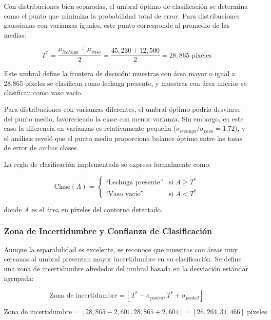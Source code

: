 Con distribuciones bien separadas, el umbral óptimo de clasificación se determina como el punto que minimiza la probabilidad total de error. Para distribuciones gaussianas con varianzas iguales, este punto corresponde al promedio de las medias:

\begin{equation}
T^* = \frac{\mu_{lechuga} + \mu_{vaso}}{2} = \frac{45,230 + 12,500}{2} = 28,865 \text{ píxeles}
\end{equation}

Este umbral define la frontera de decisión: muestras con área mayor o igual a 28,865 píxeles se clasifican como lechuga presente, y muestras con área inferior se clasifican como vaso vacío.

Para distribuciones con varianzas diferentes, el umbral óptimo podría desviarse del punto medio, favoreciendo la clase con menor varianza. Sin embargo, en este caso la diferencia en varianzas es relativamente pequeña ($\sigma_{lechuga}/\sigma_{vaso} = 1.72$), y el análisis reveló que el punto medio proporciona balance óptimo entre las tasas de error de ambas clases.

La regla de clasificación implementada se expresa formalmente como:

\begin{equation}
\text{Clase}(A) = \begin{cases}
\text{``Lechuga presente''} & \text{si } A \geq T^* \\
\text{``Vaso vacío''} & \text{si } A < T^*
\end{cases}
\end{equation}

donde $A$ es el área en píxeles del contorno detectado.

\subsubsection{Zona de Incertidumbre y Confianza de Clasificación}

Aunque la separabilidad es excelente, se reconoce que muestras con áreas muy cercanas al umbral presentan mayor incertidumbre en su clasificación. Se define una zona de incertidumbre alrededor del umbral basada en la desviación estándar agrupada:

\begin{equation}
\text{Zona de incertidumbre} = [T^* - \sigma_{pooled}, T^* + \sigma_{pooled}]
\end{equation}

\begin{equation}
\text{Zona de incertidumbre} = [28,865 - 2,601, 28,865 + 2,601] = [26,264, 31,466] \text{ píxeles}
\end{equation}


